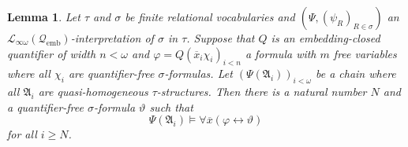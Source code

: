 \documentclass{ndjflart}
\theoremstyle{plain}
\newtheorem{lemma}[conjecture]{Lemma}
\theoremstyle{definition}
\numberwithin{equation}{section}
\DeclareMathOperator{\emb}{emb}
\begin{document}
\begin{lemma}\label{quant_elim_finite_lemma}
Let $\tau$ and $\sigma$ be finite relational vocabularies and
$(\Psi, (\psi_R)_{R \in \sigma})$ an
$\mathcal{L}_{\infty \omega}(\mathcal{Q}_{\emb})$-interpretation of
$\sigma$ in $\tau$.
Suppose that $Q$ is an embedding-closed quantifier of width $n < \omega$
and $\varphi = Q(\overline{x}_i \chi_i)_{i < n}$ a formula with $m$ free
variables where all $\chi_i$ are
quantifier-free $\sigma$-formulas.
Let $(\Psi(\mathfrak{A}_i))_{i < \omega}$ be a chain where all $\mathfrak{A}_i$
are quasi-homogeneous $\tau$-structures.
Then there is a natural number $N$ and a quantifier-free $\sigma$-formula
$\vartheta$ such that
\[
	\Psi(\mathfrak{A}_i) \vDash \forall
	\overline{x}(\varphi \leftrightarrow \vartheta)
\]
for all $i \geq N$.
\end{lemma}
\end{document}
